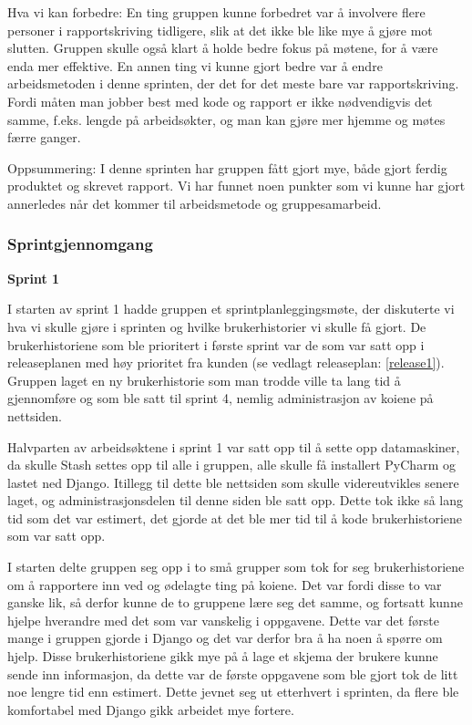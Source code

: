 \documentclass[12pt,a4paper,norsk]{article}
\begin{document}
Hva vi kan forbedre:
En ting gruppen kunne forbedret var å involvere flere personer i rapportskriving tidligere, slik at det ikke ble like mye å gjøre mot slutten. 
Gruppen skulle også klart å holde bedre fokus på møtene, for å være enda mer effektive. 
En annen ting vi kunne gjort bedre var å endre arbeidsmetoden i denne sprinten, der det for det meste bare var rapportskriving. Fordi måten man jobber best med kode og rapport er ikke nødvendigvis det samme, f.eks. lengde på arbeidsøkter, og man kan gjøre mer hjemme og møtes færre ganger. 

Oppsummering:  
I denne sprinten har gruppen fått gjort mye, både gjort ferdig produktet og skrevet rapport. Vi har funnet noen punkter som vi kunne har gjort annerledes når det kommer til arbeidsmetode og gruppesamarbeid. 

	\subsubsection{Sprintgjennomgang}
\bigskip \noindent \textbf{Sprint 1}
\par I starten av sprint 1 hadde gruppen et sprintplanleggingsmøte, der diskuterte vi hva vi skulle gjøre i sprinten og hvilke brukerhistorier vi skulle få gjort. De brukerhistoriene som ble prioritert i første sprint var de som var satt opp i releaseplanen med høy prioritet fra kunden (se vedlagt releaseplan: \ref{release1}). Gruppen laget en ny brukerhistorie som man trodde ville ta lang tid å gjennomføre og som ble satt til sprint 4, nemlig administrasjon av koiene på nettsiden. 

Halvparten av arbeidsøktene i sprint 1 var satt opp til å sette opp datamaskiner, da skulle Stash settes opp til alle i gruppen, alle skulle få installert PyCharm og lastet ned Django. Itillegg til dette ble nettsiden som skulle videreutvikles senere laget, og administrasjonsdelen til denne siden ble satt opp. Dette tok ikke så lang tid som det var estimert, det gjorde at det ble mer tid til å kode brukerhistoriene som var satt opp. 

I starten delte gruppen seg opp i to små grupper som tok for seg brukerhistoriene om å rapportere inn ved og ødelagte ting på koiene. Det var fordi disse to var ganske lik, så derfor kunne de to gruppene lære seg det samme, og fortsatt kunne hjelpe hverandre med det som var vanskelig i oppgavene. Dette var det første mange i gruppen gjorde i Django og det var derfor bra å ha noen å spørre om hjelp. Disse brukerhistoriene gikk mye på å lage et skjema der brukere kunne sende inn informasjon, da dette var de første oppgavene som ble gjort tok de litt noe lengre tid enn estimert. Dette jevnet seg ut etterhvert i sprinten, da flere ble komfortabel med Django gikk arbeidet mye fortere. 
\end{document}
